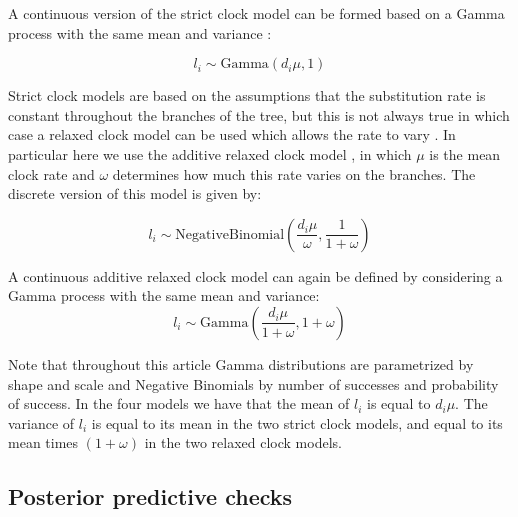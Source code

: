\documentclass{article}
\begin{document}
A continuous version of the strict clock model can be formed based on a Gamma process with the same mean and variance \citep{Didelot2021}:

\begin{equation}
l_i \sim \mathrm{Gamma}(d_i \mu,1)
\label{eq:csc}
\end{equation}

Strict clock models are based on the assumptions that the substitution rate is constant throughout the branches
of the tree, but this is not always true in which case a relaxed clock model can be used which allows
the rate to vary \citep{Drummond2006}. In particular here we use the additive relaxed clock model \citep{Didelot2021},
in which $\mu$ is the mean clock rate and $\omega$ determines how much this rate varies on the branches.
The discrete version of this model is given by: 

\begin{equation}
l_i \sim \mathrm{NegativeBinomial}\left(\frac{d_i \mu}{\omega},\frac{1}{1+\omega}\right)
\label{eq:arc}
\end{equation}

A continuous additive relaxed clock model can again be defined by considering a Gamma process with the same mean and variance:
\begin{equation}
l_i \sim \mathrm{Gamma}\left(\frac{d_i \mu}{1+\omega},1+\omega\right)
\label{eq:carc}
\end{equation}

Note that throughout this article Gamma distributions are parametrized by shape and scale and Negative Binomials 
by number of successes and probability of success. In the four models we have that the mean of $l_i$ is equal to
$d_i \mu$. The variance of $l_i$ is equal to its mean in the two strict clock models, and equal to its mean 
times $(1+\omega)$ in the two relaxed clock models.

\subsection*{Posterior predictive checks}
\end{document}
